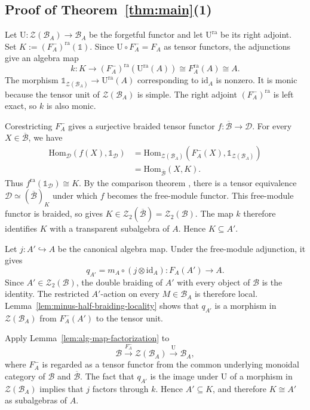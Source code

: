 \documentclass[10pt,a4paper]{amsart}
\numberwithin{equation}{section}
\newcommand{\unit}{\mathds{1}}
\newcommand{\B}{\mathcal{B}}
\newcommand{\D}{\mathcal{D}}
\newcommand{\Z}{\mathcal{Z}}
\newcommand{\Hom}{\mathrm{Hom}}
\newcommand{\ra}{\mathrm{ra}}
\newcommand{\id}{\mathrm{id}}
\newcommand{\oB}{\overline{\B}}
\newcommand{\U}{\mathrm{U}}
\begin{document}

\subsection{Proof of Theorem~\ref{thm:main}(1)}
Let $\U:\Z(\B_A)\to\B_A$ be the forgetful functor and let $\U^{\ra}$ be its
right adjoint. Set $K:=(F_A^-)^\ra(\unit)$.
Since $\U\circ F_A^-=F_A$ as tensor functors, the adjunctions
give an algebra map
\[
  k:K\longrightarrow (F_A^-)^{\ra}(\U^{\ra}(A))
  \cong F_A^{\ra}(A)
  \cong A.
\]
The morphism $\unit_{\Z(\B_A)}\to\U^{\ra}(A)$ corresponding to $\id_A$ is
nonzero. It is monic because the tensor unit of $\Z(\B_A)$ is simple. The
right adjoint $(F_A^-)^{\ra}$ is left exact, so $k$ is also monic.

Corestricting $F_A^-$ gives a surjective braided tensor functor  
$f:\oB\longrightarrow\D$. 
For every $X\in\oB$, we have
\[
\begin{aligned}
  \Hom_{\D}(f(X),\unit_{\D})
  &=\Hom_{\Z(\B_A)}(F_A^-(X),\unit_{\Z(\B_A)})
  \\
  &=\Hom_{\oB}(X,K).
\end{aligned}
\]
Thus $f^{\ra}(\unit_{\D})\cong K$. By the comparison theorem
\cite[Proposition~6.6]{shimizu2026commutative}, there is a tensor equivalence
$\D\simeq(\oB)_K$ under which $f$ becomes the free-module functor. This
free-module functor is braided, so
\cite[Lemma~5.10]{shimizu2026commutative} gives
$K\in\Z_2(\oB)=\Z_2(\B)$. The map $k$ therefore identifies $K$ with a
transparent subalgebra of $A$. Hence $K\subseteq A'$.

Let $j:A'\hookrightarrow A$ be the canonical algebra map. Under
the free-module adjunction, it gives
\[
  q_{A'}=m_A\circ(j\otimes\id_A):F_A(A')\longrightarrow A.
\]
Since $A'\in\Z_2(\B)$, the double braiding of $A'$ with every object of $\B$
is the identity. The restricted $A'$-action on every $M\in\B_A$ is therefore
local. Lemma~\ref{lem:minus-half-braiding-locality} shows that $q_{A'}$ is a
morphism in $\Z(\B_A)$ from $F_A^-(A')$ to the tensor unit.

Apply Lemma~\ref{lem:alg-map-factorization} to
\[
  \B\xrightarrow{F_A^-}\Z(\B_A)\xrightarrow{\U}\B_A,
\]
where $F_A^-$ is regarded as a tensor functor from the common underlying
monoidal category of $\B$ and $\oB$. The fact that $q_{A'}$ is the image
under $\U$ of a morphism in $\Z(\B_A)$ implies that $j$ factors through
$k$. Hence $A'\subseteq K$, and therefore $K\cong A'$ as subalgebras of
$A$.
\end{document}
